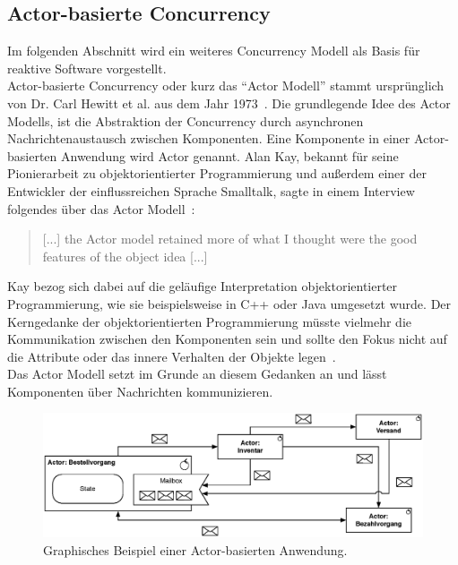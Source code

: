 \subsection{Actor-basierte Concurrency}\label{subsec:actor-model}
Im folgenden Abschnitt wird ein weiteres Concurrency Modell als Basis für reaktive Software vorgestellt.\\
Actor-basierte Concurrency oder kurz das \enquote{Actor Modell} stammt ursprünglich von Dr. Carl Hewitt et al. aus dem Jahr 1973~\cite{hewitt_universal_1973}. Die grundlegende Idee des Actor Modells, ist die Abstraktion der Concurrency durch asynchronen Nachrichtenaustausch zwischen Komponenten. Eine Komponente in einer Actor-basierten Anwendung wird Actor genannt. Alan Kay, bekannt für seine Pionierarbeit zu objektorientierter Programmierung und außerdem einer der Entwickler der einflussreichen Sprache Smalltalk, sagte in einem Interview folgendes über das Actor Modell~\cite{binstock_interview_2012}:

\begin{quotation}
[...] the Actor model retained more of what I thought were the good features of the object idea [...]
\end{quotation}

Kay bezog sich dabei auf die geläufige Interpretation objektorientierter Programmierung, wie sie beispielsweise in C++ oder Java umgesetzt wurde. Der Kerngedanke der objektorientierten Programmierung müsste vielmehr die Kommunikation zwischen den Komponenten sein und sollte den Fokus nicht auf die Attribute oder das innere Verhalten der Objekte legen~\cite[S.~10]{vernon_reactive_2016}.\\
Das Actor Modell setzt im Grunde an diesem Gedanken an und lässt Komponenten über Nachrichten kommunizieren. 

\begin{figure}[H]
 \centering
 \includegraphics[width=1.0\textwidth]{4-Hauptteil/actor-model/actor-model.eps}
 \caption{Graphisches Beispiel einer Actor-basierten Anwendung.}
 \label{fig:actor-model}
\end{figure}

